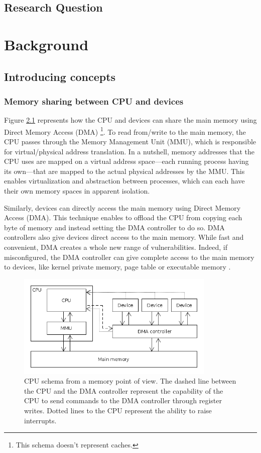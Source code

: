 \documentclass{kththesis}
\begin{document}
\section{Research Question}

\chapter{Background}

\section{Introducing concepts}

\subsection{Memory sharing between CPU and devices}

Figure \ref{cpu-memory-schema} represents how the CPU and devices can share the main memory using Direct Memory Access (DMA) \footnote{This schema doesn't represent caches.}. To read from/write to the main memory, the CPU passes through the Memory Management Unit (MMU), which is responsible for virtual/physical address translation. In a nutshell, memory addresses that the CPU uses are mapped on a virtual address space---each running process having its own---that are mapped to the actual physical addresses by the MMU. This enables virtualization and abstraction between processes, which can each have their own
memory spaces in apparent isolation.

Similarly, devices can directly access the main memory using Direct Memory Access (DMA). This technique enables to offload the CPU from copying each byte of memory and instead setting the DMA controller to do so. DMA controllers also give devices direct access to the main memory. While fast and convenient, DMA creates a whole new range of vulnerabilities. Indeed, if misconfigured, the DMA controller can give complete access to the main memory to devices, like kernel private memory, page table or executable memory \cite{schwarz_formal_2014}.

\begin{figure}[!t]
	\includegraphics[height=5cm]{figures/cpu-memory-schema.png}
	\centering
	\caption{
CPU schema from a memory point of view. The dashed line between the CPU and the DMA controller represent the capability of the CPU to send commands to the DMA controller through register writes. Dotted lines to the CPU represent the ability to raise interrupts.
}
	\label{cpu-memory-schema}
\end{figure}
\end{document}
